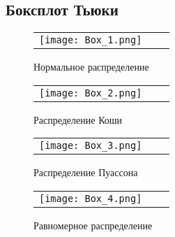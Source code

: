 \documentclass[a4paper]{article}
\begin{document}
\subsection{Боксплот Тьюки}
    \begin{figure}[H]
		\centering
		\begin{tabular}{ccc}
			\texttt{[image: Box\_1.png]}
		\end{tabular}
		\caption{Нормальное распределение} 
	\end{figure}
	\begin{figure}[H]
		\centering
		\begin{tabular}{ccc}
			\texttt{[image: Box\_2.png]}
		\end{tabular}
		\caption{Распределение Коши} 
	\end{figure}
	\begin{figure}[H]
		\centering
		\begin{tabular}{ccc}
			\texttt{[image: Box\_3.png]}
		\end{tabular}
		\caption{Распределение Пуассона} 
	\end{figure}
	\begin{figure}[H]
		\centering
		\begin{tabular}{ccc}
			\texttt{[image: Box\_4.png]}
		\end{tabular}
		\caption{Равномерное распределение} 
	\end{figure}
\end{document}
